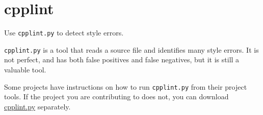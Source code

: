 
\section{cpplint}\label{sec:cpplint}
Use \texttt{cpplint.py} to detect style errors.

\texttt{cpplint.py} is a tool that reads a source file and identifies many style errors. It is not perfect, and has both false positives and false negatives, but it is still a valuable tool.

Some projects have instructions on how to run \texttt{cpplint.py} from their project tools. If the project you are contributing to does not, you can download \href{https://raw.githubusercontent.com/google/styleguide/gh-pages/cpplint/cpplint.py}{cpplint.py} separately.
